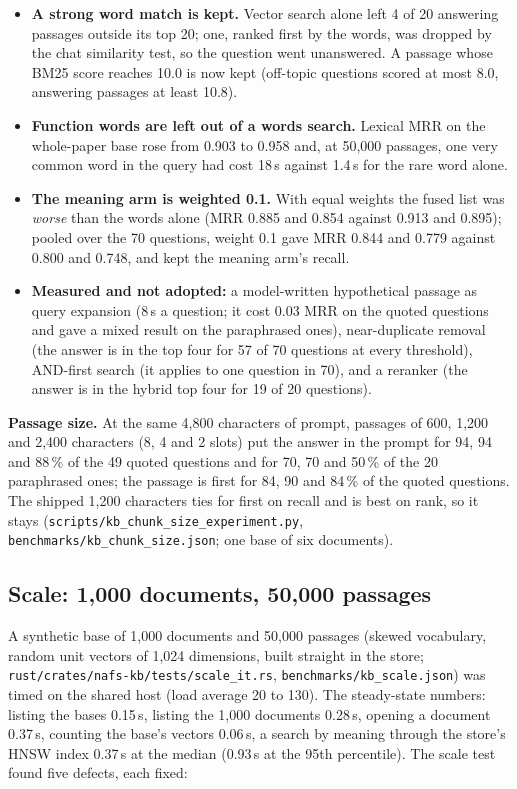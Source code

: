 \begin{itemize}
\item \textbf{A strong word match is kept.} Vector search alone left 4 of 20 answering passages outside its top 20; one, ranked first by the words, was dropped by the
  chat similarity test, so the question went unanswered. A passage whose BM25 score reaches 10.0 is now kept (off-topic questions scored at most 8.0, answering passages
  at least 10.8).
\item \textbf{Function words are left out of a words search.} Lexical MRR on the whole-paper base rose from 0.903 to 0.958 and, at 50,000 passages, one very common
  word in the query had cost 18\,s against 1.4\,s for the rare word alone.
\item \textbf{The meaning arm is weighted 0.1.} With equal weights the fused list was \emph{worse} than the words alone (MRR 0.885 and 0.854 against 0.913 and 0.895);
  pooled over the 70 questions, weight 0.1 gave MRR 0.844 and 0.779 against 0.800 and 0.748, and kept the meaning arm's recall.
\item \textbf{Measured and not adopted:} a model-written hypothetical passage as query expansion (8\,s a question; it cost 0.03 MRR on the quoted questions and gave
  a mixed result on the paraphrased ones), near-duplicate removal (the answer is in the top four for 57 of 70 questions at every threshold), AND-first search (it
  applies to one question in 70), and a reranker (the answer is in the hybrid top four for 19 of 20 questions).
\end{itemize}

\textbf{Passage size.} At the same 4,800 characters of prompt, passages of 600, 1,200 and 2,400 characters (8, 4 and 2 slots) put the answer in the prompt for 94, 94
and 88\,\% of the 49 quoted questions and for 70, 70 and 50\,\% of the 20 paraphrased ones; the passage is first for 84, 90 and 84\,\% of the quoted questions. The
shipped 1,200 characters ties for first on recall and is best on rank, so it stays (\texttt{scripts/kb\_chunk\_size\_experiment.py},
\texttt{benchmarks/kb\_chunk\_size.json}; one base of six documents).

\subsection{Scale: 1,000 documents, 50,000 passages}

A synthetic base of 1,000 documents and 50,000 passages (skewed vocabulary, random unit vectors of 1,024 dimensions, built straight in the store;
\texttt{rust/crates/nafs-kb/tests/scale\_it.rs}, \texttt{benchmarks/kb\_scale.json}) was timed on the shared host (load average 20 to 130). The
steady-state numbers: listing the bases 0.15\,s, listing the 1,000 documents 0.28\,s, opening a document 0.37\,s, counting the base's vectors 0.06\,s, a
search by meaning through the store's HNSW index 0.37\,s at the median (0.93\,s at the 95th percentile). The scale test found five defects, each fixed:

